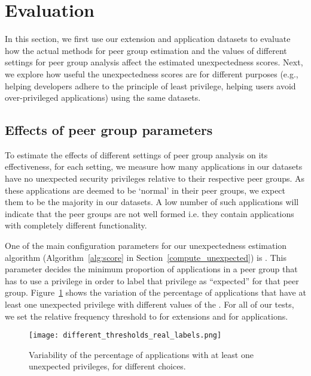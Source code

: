 \section{Evaluation} 
In this section, we first use our \Chrome{} extension and \Android{} application datasets to evaluate 
how the actual methods for peer group estimation and the values of different settings for peer group analysis affect 
the estimated unexpectedness scores. Next, we explore how useful the unexpectedness scores are for 
different purposes (e.g., helping developers adhere to the principle of least privilege, helping users avoid 
over-privileged applications) using the same datasets. 

\subsection{Effects of peer group parameters}
To estimate the effects of different settings of peer group analysis on its effectiveness, 
for each setting, we measure how many applications in our datasets have no unexpected 
security privileges relative to their respective peer groups. As these applications 
are deemed to be `normal' in their peer groups, we expect them to be the majority in our datasets. 
A low number of such applications will indicate that the peer groups are not well formed i.e. they contain 
applications with completely different functionality. 

 One of the main configuration parameters 
for our unexpectedness estimation algorithm (Algorithm~\ref{alg:score} in Section~\ref{compute_unexpected}) 
is . This parameter decides the minimum proportion of applications in a peer 
group that has to use a privilege in order to label that privilege as ``expected'' for that peer group. 
Figure~\ref{fig:percentage_different_thresholds} shows the variation of the percentage of applications 
that have at least one unexpected privilege with different values of the . 
For all of our tests, we set the relative frequency threshold to  for \Chrome{} extensions 
and  for \Android{} applications. 

\begin{figure}[!t]
\begin{center}
\texttt{[image: different\_thresholds\_real\_labels.png]}
\caption{Variability of the percentage of applications with at least one unexpected privileges, for different  choices.}
\label{fig:percentage_different_thresholds}
\end{center}
\end{figure}

